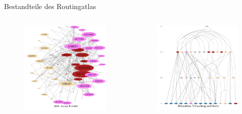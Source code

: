 \documentclass[ngerman,compress,hyperref={bookmarks}]{beamer}
\begin{document}
\begin{frame}[allowframebreaks]{Bestandteile des Routingatlas}
  \begin{columns}[c]
    \begin{column}{0.5\textwidth}
      \begin{figure}
        \label{asgraphs}
        \includegraphics[width=1\textwidth]{images/asgraph_cat5-pos-betweenness}
      \end{figure}
    \end{column}
    \begin{column}{0.5\textwidth}
      \begin{figure}
        \includegraphics[width=1\textwidth]{images/asgraph_cat9-dot}

\end{figure}
\end{column}
\end{columns}
\end{frame}
\end{document}
